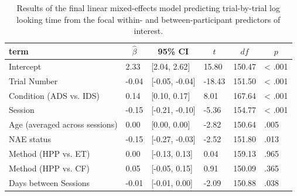 \documentclass[
  english,
  man, donotrepeattitle,floatsintext]{apa6}
\begin{document}
\begin{table}[tbp]

\begin{center}
\begin{threeparttable}

\caption{\label{tab:unnamed-chunk-44}Results of the final linear mixed-effects model predicting trial-by-trial log looking time from the focal within- and between-participant predictors of interest.}

\begin{tabular}{llllll}
\toprule
term & \multicolumn{1}{c}{$\hat{\beta}$} & \multicolumn{1}{c}{95\% CI} & \multicolumn{1}{c}{$t$} & \multicolumn{1}{c}{$\mathit{df}$} & \multicolumn{1}{c}{$p$}\\
\midrule
Intercept & 2.33 & {}[2.04, 2.62] & 15.80 & 150.47 & < .001\\
Trial Number & -0.04 & {}[-0.05, -0.04] & -18.43 & 151.50 & < .001\\
Condition (ADS vs. IDS) & 0.14 & {}[0.10, 0.17] & 8.01 & 167.64 & < .001\\
Session & -0.15 & {}[-0.21, -0.10] & -5.36 & 154.77 & < .001\\
Age (averaged across sessions) & 0.00 & {}[0.00, 0.00] & -2.82 & 150.64 & .005\\
NAE status & -0.15 & {}[-0.27, -0.03] & -2.52 & 151.80 & .013\\
Method (HPP vs. ET) & 0.00 & {}[-0.13, 0.13] & 0.04 & 159.13 & .965\\
Method (HPP vs. CF) & 0.05 & {}[-0.05, 0.15] & 0.91 & 150.09 & .365\\
Days between Sessions & -0.01 & {}[-0.01, 0.00] & -2.09 & 150.88 & .038\\
\bottomrule
\end{tabular}

\end{threeparttable}
\end{center}

\end{table}
\end{document}

